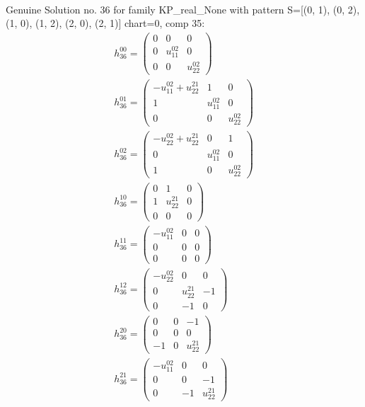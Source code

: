 \documentclass[a4paper, 11pt, twoside, onecolumn]{article}
\begin{document}
\begin{landscape}
\begin{gather*}
\end{gather*} 
Genuine Solution no. 36 for family KP_real_None with pattern S=[(0, 1), (0, 2), (1, 0), (1, 2), (2, 0), (2, 1)] chart=0, comp 35: 
\begin{gather*} 
	 h_{36}^{00}=\begin{pmatrix}0 & 0 & 0\\0 & u^{02}_{11} & 0\\0 & 0 & u^{02}_{22}\end{pmatrix}\\ 
	 h_{36}^{01}=\begin{pmatrix}- u^{02}_{11} + u^{21}_{22} & 1 & 0\\1 & u^{02}_{11} & 0\\0 & 0 & u^{02}_{22}\end{pmatrix}\\ 
	 h_{36}^{02}=\begin{pmatrix}- u^{02}_{22} + u^{21}_{22} & 0 & 1\\0 & u^{02}_{11} & 0\\1 & 0 & u^{02}_{22}\end{pmatrix}\\ 
	 h_{36}^{10}=\begin{pmatrix}0 & 1 & 0\\1 & u^{21}_{22} & 0\\0 & 0 & 0\end{pmatrix}\\ 
	 h_{36}^{11}=\begin{pmatrix}- u^{02}_{11} & 0 & 0\\0 & 0 & 0\\0 & 0 & 0\end{pmatrix}\\ 
	 h_{36}^{12}=\begin{pmatrix}- u^{02}_{22} & 0 & 0\\0 & u^{21}_{22} & -1\\0 & -1 & 0\end{pmatrix}\\ 
	 h_{36}^{20}=\begin{pmatrix}0 & 0 & -1\\0 & 0 & 0\\-1 & 0 & u^{21}_{22}\end{pmatrix}\\ 
	 h_{36}^{21}=\begin{pmatrix}- u^{02}_{11} & 0 & 0\\0 & 0 & -1\\0 & -1 & u^{21}_{22}\end{pmatrix}\\ 

\end{gather*}
\end{landscape}
\end{document}
